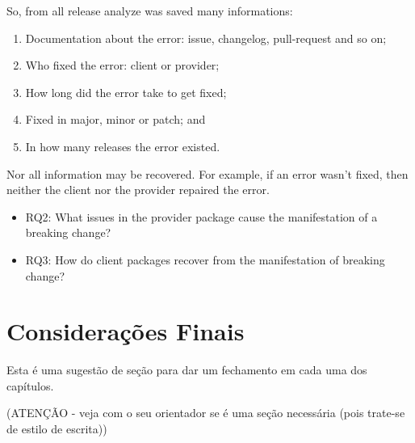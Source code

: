 So, from all release analyze was saved many informations:

\begin{enumerate}
    \item Documentation about the error: issue, changelog, pull-request and so on;
    \item Who fixed the error: client or provider;
    \item How long did the error take to get fixed;
    \item Fixed in major, minor or patch; and
    \item In how many releases the error existed.
\end{enumerate}{}

Nor all information may be recovered. For example, if an error wasn’t fixed, then neither the client nor the provider repaired the error.

\begin{itemize}
    \item RQ2: What issues in the provider package cause the manifestation of a breaking change?
\end{itemize}

\begin{itemize}
    \item RQ3: How do client packages recover from the manifestation of breaking change?
\end{itemize}



\section{Considerações Finais}
\label{cap:metodologia:sec:consideracoes:finais}

Esta é uma sugestão de seção para dar um fechamento em cada uma dos capítulos.

(ATENÇÃO - veja com o seu orientador se é uma seção necessária (pois trate-se de estilo de escrita))